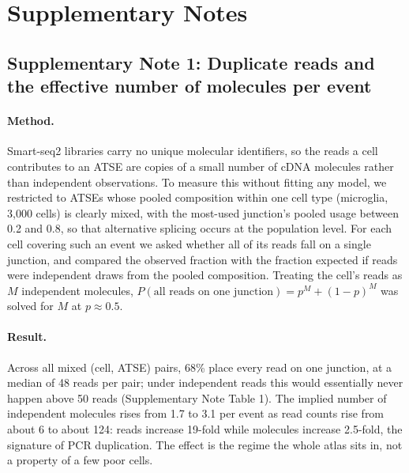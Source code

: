 
\section*{Supplementary Notes}

\subsection*{Supplementary Note 1: Duplicate reads and the effective number of molecules per event}
\label{suppnote:duplicates}

\paragraph{Method.} Smart-seq2 libraries carry no unique molecular identifiers, so the reads a cell
contributes to an ATSE are copies of a small number of cDNA molecules rather than independent
observations. To measure this without fitting any model, we restricted to ATSEs whose pooled composition
within one cell type (microglia, 3{,}000 cells) is clearly mixed, with the most-used junction's pooled
usage between 0.2 and 0.8, so that alternative splicing occurs at the population level. For each cell
covering such an event we asked whether all of its reads fall on a single junction, and compared the
observed fraction with the fraction expected if reads were independent draws from the pooled composition.
Treating the cell's reads as $M$ independent molecules, $P(\text{all reads on one junction}) = p^M + (1-p)^M$
was solved for $M$ at $p \approx 0.5$.

\paragraph{Result.} Across all mixed (cell, ATSE) pairs, 68\% place every read on one junction, at a median of
48 reads per pair; under independent reads this would essentially never happen above 50 reads
(Supplementary Note Table 1). The implied number of independent molecules rises from 1.7 to 3.1 per event
as read counts rise from about 6 to about 124: reads increase 19-fold while molecules increase 2.5-fold,
the signature of PCR duplication. The effect is the regime the whole atlas sits in, not a property of a
few poor cells.

